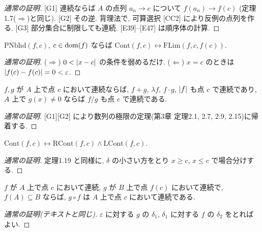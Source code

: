 \begin{lem}\end{lem}
\begin{proof}[通常の証明]
  [G1] 連続ならば $A$ の点列 $a_n \to c$ について $f(a_n) \to f(c)$ (定理1.7($\Rightarrow$)と同じ). [G2] その逆. 背理法で, 可算選択 [CC2] により反例の点列を作る. [G3] 部分集合に制限しても連続. [E39]--[E47] は順序体の計算.
\end{proof}

\begin{prop}
  $\mathrm{PNbhd}(f, c)$, $c \in \mathrm{dom}(f)$ ならば $\mathrm{Cont}(f, c) \leftrightarrow \mathrm{FLim}(f, c, f(c))$.
\end{prop}
\begin{proof}[通常の証明]
  ($\Rightarrow$) $0 < \lvert x - c\rvert$ の条件を弱めるだけ. ($\Leftarrow$) $x = c$ のときは $\lvert f(c) - f(c)\rvert = 0 < \varepsilon$.
\end{proof}

\begin{thm}[テキスト定理2.3]
  $f, g$ が $A$ 上で点 $c$ において連続ならば, $f + g$, $\lambda f$, $f \cdot g$, $\lvert f\rvert$ も点 $c$ で連続であり, $A$ 上で $g(x) \neq 0$ ならば $f/g$ も点 $c$ で連続である.
\end{thm}
\begin{proof}[通常の証明]
  [G1][G2] により数列の極限の定理(第3章 定理2.1, 2.7, 2.9, 2.15)に帰着する.
\end{proof}

\begin{thm}[テキスト定理2.4]
  $\mathrm{Cont}(f, c) \leftrightarrow \mathrm{RCont}(f, c) \land \mathrm{LCont}(f, c)$.
\end{thm}
\begin{proof}[通常の証明]
  定理1.19 と同様に, $\delta$ の小さい方をとり $x \geq c$, $x \leq c$ で場合分けする.
\end{proof}

\begin{thm}
  $f$ が $A$ 上で点 $c$ において連続, $g$ が $B$ 上で点 $f(c)$ において連続で, $f(A) \subseteq B$ ならば, $g \circ f$ は $A$ 上で点 $c$ において連続である.
\end{thm}
\begin{proof}[通常の証明(テキストと同じ)]
  $\varepsilon$ に対する $g$ の $\delta_1$, $\delta_1$ に対する $f$ の $\delta_2$ をとればよい.
\end{proof}

